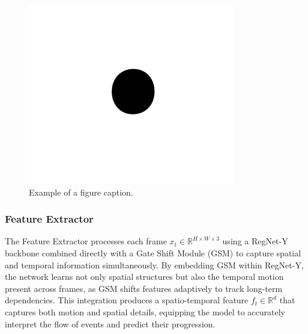 \documentclass[conference]{IEEEtran}
\begin{document}
\begin{figure}[htbp]
    \centerline{\includegraphics{fig1.png}}
    \caption{Example of a figure caption.}
    \label{fig}
    \end{figure}
\subsubsection{Feature Extractor}
The Feature Extractor processes each frame \( x_t \in \mathbb{R}^{H \times W \times 3} \) using a RegNet-Y backbone combined directly with a Gate Shift Module (GSM) to capture spatial and temporal information simultaneously. By embedding GSM within RegNet-Y, the network learns not only spatial structures but also the temporal motion present across frames, as GSM shifts features adaptively to track long-term dependencies. This integration produces a spatio-temporal feature \( f_t \in \mathbb{R}^d \) that captures both motion and spatial details, equipping the model to accurately interpret the flow of events and predict their progression.
\end{document}
